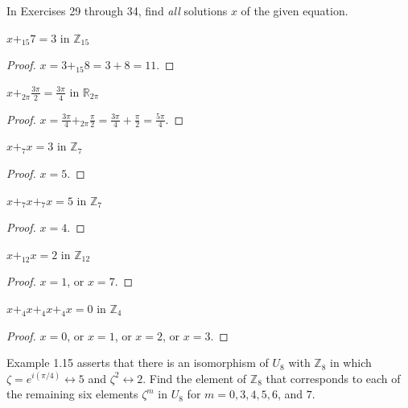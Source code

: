In Exercises 29 through 34, find \textit{all} solutions $x$ of the given equation.

\begin{exercise}
    $x {+}_{15} 7 = 3$ in $\mathbb{Z}_{15}$
\end{exercise}

\begin{proof}
    $x = 3 {+}_{15} 8 = 3 + 8 = 11$.
\end{proof}

\begin{exercise}
    $x {+}_{2\pi} \frac{3\pi}{2} = \frac{3\pi}{4}$ in $\mathbb{R}_{2\pi}$
\end{exercise}

\begin{proof}
    $x = \frac{3\pi}{4} {+}_{2\pi} \frac{\pi}{2} = \frac{3\pi}{4} + \frac{\pi}{2} = \frac{5\pi}{4}$.
\end{proof}

\begin{exercise}
    $x {+}_{7} x = 3$ in $\mathbb{Z}_{7}$
\end{exercise}

\begin{proof}
    $x = 5$.
\end{proof}

\begin{exercise}
    $x {+}_{7} x {+}_{7} x = 5$ in $\mathbb{Z}_{7}$
\end{exercise}

\begin{proof}
    $x = 4$.
\end{proof}

\begin{exercise}
    $x {+}_{12} x = 2$ in $\mathbb{Z}_{12}$
\end{exercise}

\begin{proof}
    $x = 1$, or $x = 7$.
\end{proof}

\begin{exercise}
    $x {+}_{4} x {+}_{4} x {+}_{4} x = 0$ in $\mathbb{Z}_{4}$
\end{exercise}

\begin{proof}
    $x = 0$, or $x = 1$, or $x = 2$, or $x = 3$.
\end{proof}

\begin{exercise}
    Example 1.15 asserts that there is an isomorphism of $U_{8}$ with $\mathbb{Z}_{8}$ in which $\zeta = e^{i(\pi/4)}\leftrightarrow 5$ and $\zeta^{2}\leftrightarrow 2$. Find the element of $\mathbb{Z}_{8}$ that corresponds to each of the remaining six elements $\zeta^{m}$ in $U_{8}$ for $m = 0, 3, 4, 5, 6$, and $7$.
\end{exercise}

